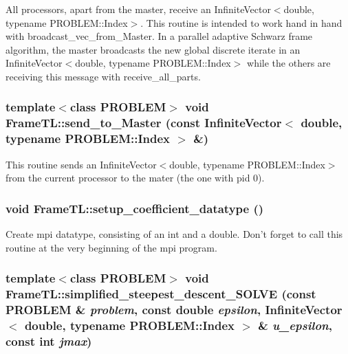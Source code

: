All processors, apart from the master, receive an InfiniteVector$<$double, typename PROBLEM::Index$>$. This routine is intended to work hand in hand with broadcast\_\-vec\_\-from\_\-Master. In a parallel adaptive Schwarz frame algorithm, the master broadcasts the new global discrete iterate in an InfiniteVector$<$double, typename PROBLEM::Index$>$ while the others are receiving this message with receive\_\-all\_\-parts. \hypertarget{namespaceFrameTL_868f995657a7f68345fe24340658282e}{
\subsubsection[send\_\-to\_\-Master]{\setlength{\rightskip}{0pt plus 5cm}template$<$class PROBLEM$>$ void FrameTL::send\_\-to\_\-Master (const InfiniteVector$<$ double, typename PROBLEM::Index $>$ \&)}}
\label{namespaceFrameTL_868f995657a7f68345fe24340658282e}


This routine sends an InfiniteVector$<$double, typename PROBLEM::Index$>$ from the current processor to the mater (the one with pid 0). \hypertarget{namespaceFrameTL_010a7b97f26561b6923f285c1cbb8d02}{
\subsubsection[setup\_\-coefficient\_\-datatype]{\setlength{\rightskip}{0pt plus 5cm}void FrameTL::setup\_\-coefficient\_\-datatype ()}}
\label{namespaceFrameTL_010a7b97f26561b6923f285c1cbb8d02}


Create mpi datatype, consisting of an int and a double. Don't forget to call this routine at the very beginning of the mpi program. \hypertarget{namespaceFrameTL_c04ff1f80c162c3369928a2b45402beb}{
\subsubsection[simplified\_\-steepest\_\-descent\_\-SOLVE]{\setlength{\rightskip}{0pt plus 5cm}template$<$class PROBLEM$>$ void FrameTL::simplified\_\-steepest\_\-descent\_\-SOLVE (const PROBLEM \& {\em problem}, \/  const double {\em epsilon}, \/  InfiniteVector$<$ double, typename PROBLEM::Index $>$ \& {\em u\_\-epsilon}, \/  const int {\em jmax})}}
\label{namespaceFrameTL_c04ff1f80c162c3369928a2b45402beb}


